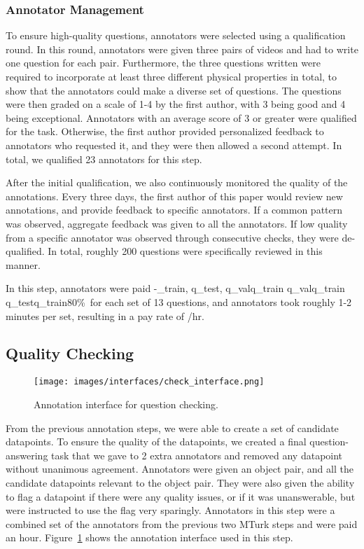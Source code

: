 \documentclass[runningheads]{llncs}
\begin{document}
\subsubsection{Annotator Management} To ensure high-quality questions, annotators were selected using a qualification round. In this round, annotators were given three pairs of videos and had to write one question for each pair. Furthermore, the three questions written were required to incorporate at least three different physical properties in total, to show that the annotators could make a diverse set of questions. The questions were then graded on a scale of 1-4 by the first author, with 3 being good and 4 being exceptional. Annotators with an average score of 3 or greater were qualified for the task. Otherwise, the first author provided personalized feedback to annotators who requested it, and they were then allowed a second attempt. In total, we qualified 23 annotators for this step. 

After the initial qualification, we also continuously monitored the quality of the annotations. Every three days, the first author of this paper would review new annotations, and provide feedback to specific annotators. If a common pattern was observed, aggregate feedback was given to all the annotators. If low quality from a specific annotator was observed through consecutive checks, they were de-qualified. In total, roughly 200 questions were specifically reviewed in this manner. 

In this step, annotators were paid \9-\q_{train}, q_{test}, q_{val}q_{train} \cup q_{val}q_{train} \cup q_{test}q_{train}80\%\ for each set of 13 questions, and annotators took roughly 1-2 minutes per set, resulting in a pay rate of /hr. 

\subsection{Quality Checking}

\begin{figure}[t]
    \centering
  \texttt{[image: images/interfaces/check\_interface.png]}
  \caption{Annotation interface for question checking.}
  \label{fig:check_interface}
\end{figure}

From the previous annotation steps, we were able to create a set of candidate datapoints. To ensure the quality of the datapoints, we created a final question-answering task that we gave to 2 extra annotators and removed any datapoint without unanimous agreement. Annotators were given an object pair, and all the candidate datapoints relevant to the object pair. They were also given the ability to flag a datapoint if there were any quality issues, or if it was unanswerable, but were instructed to use the flag very sparingly. Annotators in this step were a combined set of the annotators from the previous two MTurk steps and were paid  an hour. Figure~\ref{fig:check_interface} shows the annotation interface used in this step. 
\end{document}
